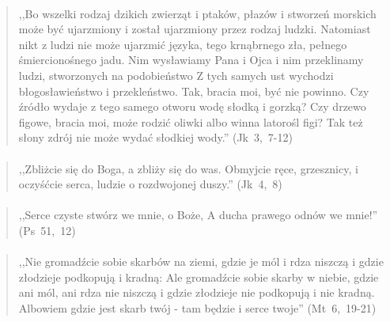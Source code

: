 \documentclass[10pt,a4paper,oneside]{article}
\begin{document}
\paragraph{}
\begin{quote}
,,Bo wszelki rodzaj dzikich zwierząt i ptaków, płazów i stworzeń morskich może być ujarzmiony i został ujarzmiony przez rodzaj ludzki. Natomiast nikt z ludzi nie może ujarzmić języka, tego krnąbrnego zła, pełnego śmiercionośnego jadu. Nim wysławiamy Pana i Ojca i nim przeklinamy ludzi, stworzonych na podobieństwo Z tych samych ust wychodzi błogosławieństwo i przekleństwo. Tak, bracia moi, być nie powinno. Czy źródło wydaje z tego samego otworu wodę słodką i gorzką? Czy drzewo figowe, bracia moi, może rodzić oliwki albo winna latorośl figi? Tak też słony zdrój nie może wydać słodkiej wody.'' \mbox{(Jk 3, 7-12)}
\end{quote}
\paragraph{}
\begin{quote}
,,Zbliżcie się do Boga, a zbliży się do was. Obmyjcie ręce, grzesznicy, i oczyśćcie serca, ludzie o rozdwojonej duszy.'' \mbox{(Jk 4, 8)}
\end{quote}
\paragraph{}
\begin{quote}
,,Serce czyste stwórz we mnie, o Boże, A ducha prawego odnów we mnie!'' \mbox{(Ps 51, 12)}
\end{quote}
\paragraph{}
\begin{quote}
,,Nie gromadźcie sobie skarbów na ziemi, gdzie je mól i rdza niszczą i gdzie złodzieje podkopują i kradną: Ale gromadźcie sobie skarby w niebie, gdzie ani mól, ani rdza nie niszczą i gdzie złodzieje nie podkopują i nie kradną. Albowiem gdzie jest skarb twój - tam będzie i serce twoje'' \mbox{(Mt 6, 19-21)}
\end{quote}
\end{document}
